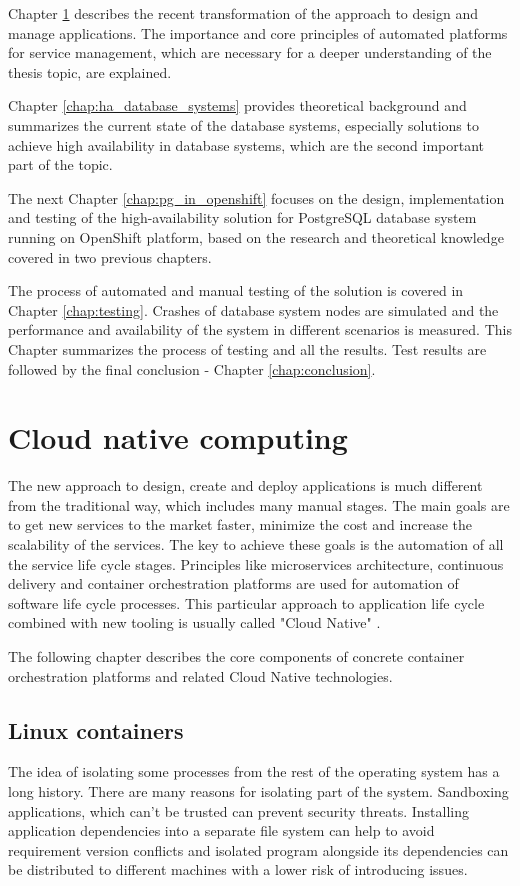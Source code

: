 \documentclass[
  digital, %
  twoside, %
  table,   %
  nolof,   %
  nolot,   %
]{fithesis3}
\begin{document}
Chapter \ref{chap:cloud_native} describes the recent transformation of the approach to design and manage applications. The importance and core principles of automated platforms for service management, which are necessary for a deeper understanding of the thesis topic, are explained.

Chapter \ref{chap:ha_database_systems} provides theoretical background and summarizes the current state of the database systems, especially solutions to achieve high availability in database systems, which are the second important part of the topic.

The next Chapter \ref{chap:pg_in_openshift} focuses on the design, implementation and testing of the high-availability solution for PostgreSQL database system running on OpenShift platform, based on the research and theoretical knowledge covered in two previous chapters.

The process of automated and manual testing of the solution is covered in Chapter \ref{chap:testing}. Crashes of database system nodes are simulated and the performance and availability of the system in different scenarios is measured. This Chapter summarizes the process of testing and all the results. Test results are followed by the final conclusion - Chapter \ref{chap:conclusion}.


\chapter{Cloud native computing} \label{chap:cloud_native}
The new approach to design, create and deploy applications is much different from the traditional way, which includes many manual stages. The main goals are to get new services to the market faster, minimize the cost and increase the scalability of the services. The key to achieve these goals is the automation of all the service life cycle stages. Principles like microservices architecture, continuous delivery and container orchestration platforms are used for automation of software life cycle processes. This particular approach to application life cycle combined with new tooling is usually called "Cloud Native" \cite{cloud_native}.

The following chapter describes the core components of concrete container orchestration platforms and related Cloud Native technologies.

\section{Linux containers} \label{sec:containers}
The idea of isolating some processes from the rest of the operating system has a long history. There are many reasons for isolating part of the system. Sandboxing applications, which can't be trusted can prevent security threats. Installing application dependencies into a separate file system can help to avoid requirement version conflicts and isolated program alongside its dependencies can be distributed to different machines with a lower risk of introducing issues.
\end{document}
